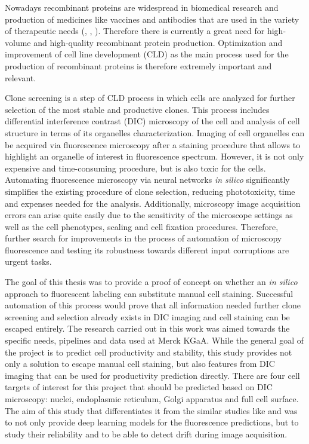Nowadays recombinant proteins are widespread in biomedical research and production of medicines like vaccines and antibodies that are used in the variety of therapeutic needs (\cite{Liu_2022}, \cite{Kim_2011}, \cite{Jayapal_2007}). Therefore there is currently a great need for high-volume and high-quality recombinant protein production. Optimization and improvement of cell line development (CLD) as the main process used for the production of recombinant proteins is therefore extremely important and relevant.

Clone screening is a step of CLD process in which cells are analyzed for further selection of the most stable and productive clones. This process includes differential interference contrast (DIC) microscopy of the cell and analysis of cell structure in terms of its organelles characterization. Imaging of cell organelles can be acquired via fluorescence microscopy after a staining procedure that allows to highlight an organelle of interest in fluorescence spectrum. However, it is not only expensive and time-consuming procedure, but is also toxic for the cells. Automating fluorescence microscopy via neural networks \textit{in silico} significantly simplifies the existing procedure of clone selection, reducing phototoxicity, time and expenses needed for the analysis. Additionally, microscopy image acquisition errors can arise quite easily due to the sensitivity of the microscope settings as well as the cell phenotypes, scaling and cell fixation procedures. Therefore, further search for improvements in the process of automation of microscopy fluorescence and testing its robustness towards different input corruptions are urgent tasks.

The goal of this thesis was to provide a proof of concept on whether an \textit{in silico} approach to fluorescent labeling can substitute manual cell staining. Successful automation of this process would prove that all information needed further clone screening and selection already exists in DIC imaging and cell staining can be escaped entirely. The research carried out in this work was aimed towards the specific needs, pipelines and data used at Merck KGaA. While the general goal of the project is to predict cell productivity and stability, this study provides not only a solution to escape manual cell staining, but also features from DIC imaging that can be used for productivity prediction directly. There are four cell targets of interest for this project that should be predicted based on DIC microscopy: nuclei, endoplasmic reticulum, Golgi apparatus and full cell surface. The aim of this study that differentiates it from the similar studies like \cite{Lachance_2020} and \cite{Christiansen_2018} was to not only provide deep learning models for the fluorescence predictions, but to study their reliability and to be able to detect drift during image acquisition.

